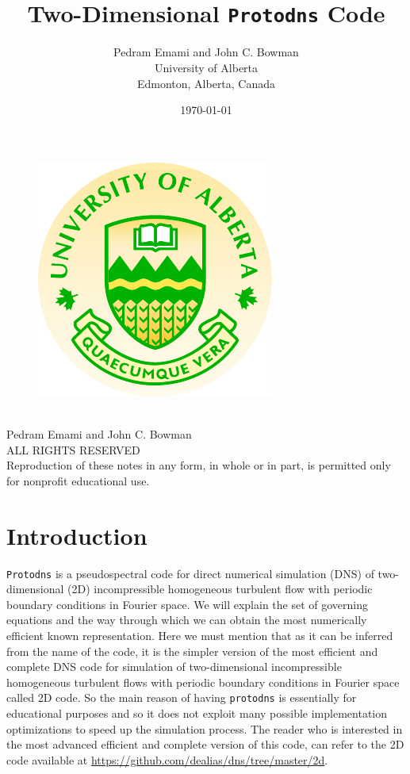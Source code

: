 \documentclass[12pt]{article}
\title{\huge{\textbf{\\Two-Dimensional {\tt Protodns} Code}}}
\author{Pedram Emami and John C. Bowman\\University of Alberta\\Edmonton,
  Alberta, Canada}
\date{\today}
\begin{document}
\maketitle

\thispagestyle{empty}
\begin{figure}[h]
\centering
\includegraphics{uofa}
\end{figure}
\newpage
\thispagestyle{empty}
\begin{center}
\ \vspace{20cm}\\
Pedram Emami and John C. Bowman\\
ALL RIGHTS RESERVED\\
Reproduction of these notes in any form, in whole or in part, is permitted only for nonprofit educational use.
\end{center}
\newpage
\setcounter{page}{1}
\section{Introduction}
{\tt Protodns} is a pseudospectral code for
direct numerical simulation (DNS) of two-dimensional (2D) incompressible homogeneous
  turbulent flow with periodic boundary conditions in Fourier space. We
  will explain the set of governing equations and the way through which we
  can obtain the most numerically efficient known representation.
Here we must mention that as it can be inferred from the name of the code, it is the simpler version of the most efficient and complete DNS code for simulation of two-dimensional incompressible homogeneous turbulent flows with periodic boundary conditions in Fourier space called 2D code. So the main reason of having {\tt protodns} is essentially for educational purposes and so it does not exploit many possible implementation optimizations to speed up the simulation process. The reader who is interested in the most advanced efficient and complete version of this code, can refer to the 2D code available at \url{https://github.com/dealias/dns/tree/master/2d}.
%
\end{document}

